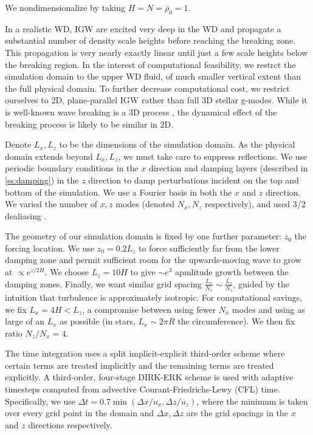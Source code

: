 \documentclass[
        fleqn,
        usenatbib,
    ]{mnras}
\begin{document}
We nondimensionalize by taking $H = N = \overline{\rho}_0 = 1$.

In a realistic WD, IGW are excited very deep in the WD and propagate a
substantial number of density scale heights before reaching the breaking zone.
This propagation is very nearly exactly linear until just a few scale heights
below the breaking region. In the interest of computational feasibility, we
restrct the simulation domain to the upper WD fluid, of much smaller vertical
extent than the full physical domain. To further decrease computational cost, we
restrict ourselves to 2D, plane-parallel IGW rather than full 3D stellar
g-modes. While it is well-known wave breaking is a 3D process
\citep{klostermeyer,winters1994}, the dynamical effect of the breaking process
is likely to be similar in 2D.

Denote $L_x, L_z$ to be the dimensions of the simulation domain. As the physical
domain extends beyond $L_x, L_z$, we must take care to suppress reflections. We
use periodic boundary conditions in the $x$ direction and damping layers
(described in \autoref{ss:damping}) in the $z$ direction to damp perturbations
incident on the top and bottom of the simulation. We use a Fourier basis in both
the $x$ and $z$ direction. We varied the number of $x, z$ modes (denoted $N_x,
N_z$ respectively), and used $3/2$ dealiasing \citep{boyd}.

The geometry of our simulation domain is fixed by one further parameter: $z_0$
the forcing location. We use $z_0 = 0.2L_z$ to force sufficiently far from the
lower damping zone and permit sufficient room for the upwards-moving wave to
grow at $\propto e^{z/2H}$. We choose $L_z = 10H$ to give $\sim e^3$ apmlitude
growth between the damping zones. Finally, we want similar grid spacing
$\frac{L_x}{N_x} \sim \frac{L_z}{N_z}$, guided by the intuition that turbulence
is approximately isotropic. For computational savings, we fix $L_x = 4H < L_z$,
a compromise between using fewer $N_x$ modes and using as large of an $L_x$ as
possible (in stars, $L_x \sim 2\pi R$ the circumference). We then fix ratio $N_z
/ N_x = 4$.

The time integration uses a split implicit-explicit third-order scheme where
certain terms are treated implicitly and the remaining terms are treated
explicitly. A third-order, four-stage DIRK-ERK scheme \citep{ascher} is used
with adaptive timesteps computed from advective Courant-Friedrichs-Lewy (CFL)
time. Specifically, we use $\Delta t = 0.7 \min(\Delta x / u_x,\Delta z /
u_{z})$, where the minimum is taken over every grid point in the domain and
$\Delta x,\Delta z$ are the grid spacings in the $x$ and $z$ directions
respectively.
\end{document}
